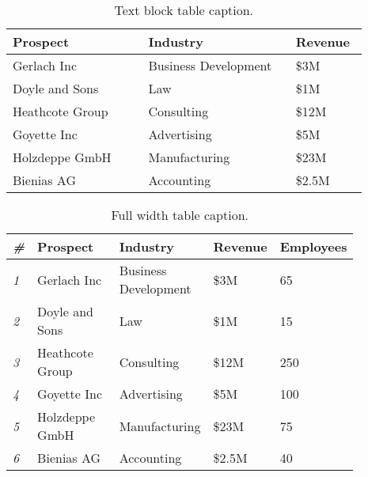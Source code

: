 \documentclass[
	a4paper, %
	12pt, %
]{CSSullivanBusinessReport}
\begin{document}
\begin{table}[H] %
	\caption{Text block table caption.}
	\begin{tabular}{L{0.35\linewidth} L{0.38\linewidth} L{0.16\linewidth}}
		\toprule
		\textbf{Prospect} & \textbf{Industry} & \textbf{Revenue} \\
		\midrule
		Gerlach Inc & Business Development & \$3M\\
		Doyle and Sons & Law & \$1M\\
		Heathcote Group & Consulting & \$12M\\
		Goyette Inc & Advertising & \$5M\\
		Holzdeppe GmbH & Manufacturing & \$23M\\
		Bienias AG & Accounting & \$2.5M\\
		\bottomrule
	\end{tabular}
	\label{tab:example}
\end{table}


\begin{table*} %
	\caption{Full width table caption.}
	\begin{tabular}{C{0.03\linewidth} L{0.25\linewidth} L{0.27\linewidth} L{0.16\linewidth} L{0.16\linewidth}}
		\toprule
		\textit{\#} & \textbf{Prospect} & \textbf{Industry} & \textbf{Revenue} & \textbf{Employees} \\
		\midrule
		\textit{1} & Gerlach Inc & Business Development & \$3M & 65\\
		\textit{2} & Doyle and Sons & Law & \$1M & 15\\
		\textit{3} & Heathcote Group & Consulting & \$12M & 250\\
		\textit{4} & Goyette Inc & Advertising & \$5M & 100\\
		\textit{5} & Holzdeppe GmbH & Manufacturing & \$23M & 75\\
		\textit{6} & Bienias AG & Accounting & \$2.5M & 40\\
		\bottomrule
	\end{tabular}
\end{table*}

\end{document}
